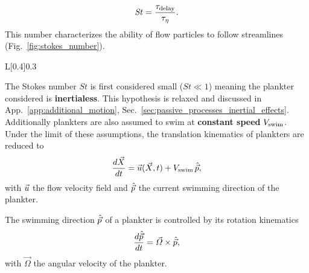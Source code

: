 \begin{equation}\label{eq:stokes_number}
	\mathit{St} = \frac{\tau_{\mathrm{delay}}}{\tau_{\eta}}.
\end{equation}
This number characterizes the ability of flow particles to follow streamlines (Fig.~\ref{fig:stokes_number}).
\begin{wrapfigure}[15]{L}[0.4\width]{0.3\textwidth}
	\centering
	\vspace{5pt}
	\def\svgwidth{0.25\textwidth}
	
	\captionsetup{width=0.25\textwidth}
  	\caption{
  		Illustration of the influence of the Stokes number.
  	}
  	\label{fig:stokes_number}
\end{wrapfigure}

The Stokes number $\mathit{St}$ is first considered small ($\mathit{St} \ll 1$) meaning the plankter considered is \textbf{inertialess}.
This hypothesis is relaxed and discussed in App.~\ref{app:additional_motion}, Sec.~\ref{sec:passive_processes_inertial_effects}.
Additionally plankters are also assumed to swim at \textbf{constant speed} $V_{\mathrm{swim}}$.
Under the limit of these assumptions, the translation kinematics of plankters are reduced to
\begin{equation}\label{eq:translation}
	\frac{d \vec{X}}{dt} = \vec{u} (\vec{X}, t) + V_{\mathrm{swim}} \, \hat{\vec{p}},
\end{equation}
with $\vec{u}$ the flow velocity field and $\hat{\vec{p}}$ the current swimming direction of the plankter.

The swimming direction $\hat{\vec{p}}$ of a plankter is controlled by its rotation kinematics
\begin{equation}\label{eq:translation}
	\frac{d \hat{\vec{p}}}{dt} = \vec{\varOmega} \times \hat{\vec{p}},
\end{equation}
with $\vec{\varOmega}$ the angular velocity of the plankter.

